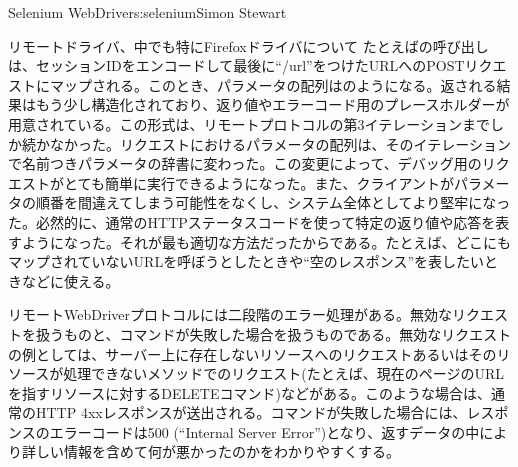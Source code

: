 \begin{aosachapter}{Selenium WebDriver}{s:selenium}{Simon Stewart}
\begin{aosasect1}{リモートドライバ、中でも特にFirefoxドライバについて}
たとえばの呼び出しは、セッションIDをエンコードして最後に``/url''をつけたURLへのPOSTリクエストにマップされる。このとき、パラメータの配列はのようになる。返される結果はもう少し構造化されており、返り値やエラーコード用のプレースホルダーが用意されている。この形式は、リモートプロトコルの第3イテレーションまでしか続かなかった。リクエストにおけるパラメータの配列は、そのイテレーションで名前つきパラメータの辞書に変わった。この変更によって、デバッグ用のリクエストがとても簡単に実行できるようになった。また、クライアントがパラメータの順番を間違えてしまう可能性をなくし、システム全体としてより堅牢になった。必然的に、通常のHTTPステータスコードを使って特定の返り値や応答を表すようになった。それが最も適切な方法だったからである。たとえば、どこにもマップされていないURLを呼ぼうとしたときや``空のレスポンス''を表したいときなどに使える。

リモートWebDriverプロトコルには二段階のエラー処理がある。無効なリクエストを扱うものと、コマンドが失敗した場合を扱うものである。無効なリクエストの例としては、サーバー上に存在しないリソースへのリクエストあるいはそのリソースが処理できないメソッドでのリクエスト(たとえば、現在のページのURLを指すリソースに対するDELETEコマンド)などがある。このような場合は、通常のHTTP 4xxレスポンスが送出される。コマンドが失敗した場合には、レスポンスのエラーコードは500 (``Internal Server Error'')となり、返すデータの中により詳しい情報を含めて何が悪かったのかをわかりやすくする。


\end{aosasect1}
\end{aosachapter}
